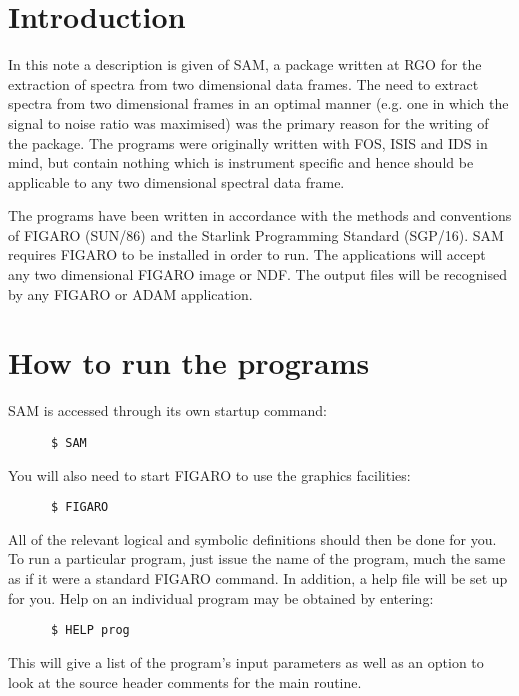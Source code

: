 \newpage
\section{Introduction}

In this note a description is given of SAM, a package written at RGO for the
extraction of spectra from two dimensional data frames.  The need to extract
spectra from two dimensional frames in an optimal manner (e.g. one in which the
signal to noise ratio was maximised) was the primary reason for the writing of
the package. The programs were originally written with FOS, ISIS and IDS in
mind, but contain nothing which  is instrument specific and hence should be
applicable to any two dimensional spectral data frame.

The programs have been written in accordance with the methods and conventions
of FIGARO (SUN/86) and the Starlink Programming Standard (SGP/16). SAM requires
FIGARO to be installed in order to run. The applications will accept any two
dimensional FIGARO image or NDF.  The output files will be recognised by any
FIGARO or ADAM application.

\section{How to run the programs}

SAM is accessed through its own startup command:

\begin{verbatim}
      $ SAM
\end{verbatim}

You will also need to start FIGARO to use the graphics facilities:

\begin{verbatim}
      $ FIGARO
\end{verbatim}

All of the relevant logical and symbolic definitions should then be done for
you.  To run a particular program, just issue the name of the program, much the
same as if it were a standard FIGARO command. In addition, a help file will
be set up for you. Help on an individual program may be obtained by
entering:
\begin{verbatim}
      $ HELP prog
\end{verbatim}

This will give a list of the program's input parameters as well as an option to
look at the source header comments for the main routine.

